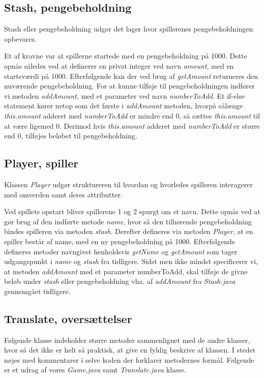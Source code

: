 \subsection{Stash, pengebeholdning}
\noindent Stash eller pengebeholdning udgør det lager hvor spillerenes pengebeholdningen opbevares. 

\noindent Et af kravne var at spillerne startede med en pengebeholdning på 1000.
Dette opnås således ved at definerer en privat integer ved navn \textit{amount}, med en startsværdi på 1000.
Efterfølgende kan der ved brug af \textit{getAmount} returneres den nuværende pengebeholdning.
For at kunne tilføje til pengebeholdningen indfører vi metoden \textit{addAmount}, med et parameter ved navn \textit{numberToAdd}.
Et if-else statement kører netop som det første i \textit{addAmount} metoden, hvorpå sålænge \textit{this.amount} adderet med \textit{numberToAdd} er mindre end 0, så sættes \textit{this.amount} til at være ligemed 0.
Derimod hvis \textit{this.amount} adderet med \textit{numberToAdd} er større end 0, tilføjes beløbet til pengebeholdning.\\

\subsection{Player, spiller}
\noindent Klassen \textit{Player} udgør struktureren til hvordan og hvorledes spilleren interagerer med omverden samt deres attributter.

\noindent Ved spillets opstart bliver spillerene 1 og 2 spurgt om et navn.
Dette opnås ved at gør brug af den indførte metode \textit{name}, hvor så den tilhørende pengebeholdning bindes spilleren via metoden \textit{stash}.
Derefter defineres via metoden \textit{Player}, at en spiller består af name, med en ny pengebeholdning på 1000.
Efterfølgende defineres metoder navngivet henholdsvis \textit{getName} og \textit{getAmount} som tager udgangspunkt i \textit{name} og \textit{stash} fra tidligere.
Sidst men ikke mindst specificerer vi, at metoden \textit{addAmount} med et parameter {numberToAdd}, skal tilføje de givne beløb under \textit{stash} eller pengebeholdning vha. af \textit{addAmount} fra \textit{Stash.java} gennemgået tidligere.\\

\subsection{Translate, oversættelser}
\noindent Følgende klasse indeholder større metoder sammenlignet med de andre klasser, hvor så det ikke er helt så praktisk, at give en fyldig beskrive af klassen.
I stedet nøjes med kommentarer i selve koden der forklarer metodernes formål.
Følgende er et udrag af vores \textit{Game.java} samt \textit{Translate.java} klasse.